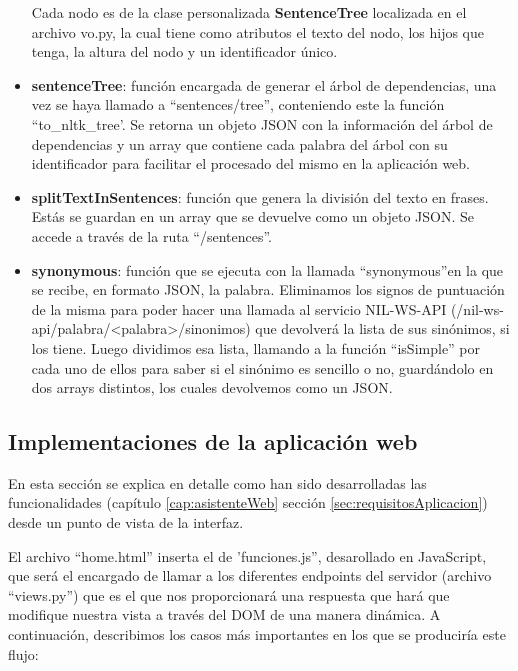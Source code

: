 \begin{itemize}
	Cada nodo es de la clase personalizada \textbf{SentenceTree} localizada en el archivo vo.py, la cual tiene como atributos el texto del nodo, los hijos que tenga, la altura del nodo y un identificador único.
	
	\item \textbf{sentenceTree}: función encargada de generar el árbol de dependencias, una vez se haya llamado a ``sentences/tree'', conteniendo este la función ``to\_nltk\_tree'. Se retorna un objeto JSON con la información del árbol de dependencias y un array que contiene cada palabra del árbol con su identificador para facilitar el procesado del mismo en la aplicación web.
	
	\item \textbf{splitTextInSentences}: función que genera la división del texto en frases. Estás se guardan en un array que se devuelve como un objeto JSON. Se accede a través de la ruta ``/sentences''.
	
	\item \textbf{synonymous}: función que se ejecuta con la llamada ``synonymous''en la que se recibe, en formato JSON, la palabra. Eliminamos los signos de puntuación de la misma para poder hacer una llamada al servicio NIL-WS-API (/nil-ws-api/palabra/<palabra>/sinonimos) que devolverá la lista de sus sinónimos, si los tiene.
	Luego dividimos esa lista, llamando a la función ``isSimple'' por cada uno de ellos para saber si el sinónimo es sencillo o no, guardándolo en dos arrays distintos, los cuales devolvemos como un JSON.
	
\end{itemize}
\subsection{Implementaciones de la aplicación web}\label{subsec:implementacionAplicacionWeb}

En esta sección se explica en detalle como han sido desarrolladas las funcionalidades (capítulo \ref{cap:asistenteWeb} sección \ref{sec:requisitosAplicacion}) desde un punto de vista de la interfaz. 

El archivo ``home.html'' inserta el de 'funciones.js'', desarollado en JavaScript, que será el encargado de llamar a los diferentes endpoints del servidor (archivo ``views.py'') que es el que nos proporcionará una respuesta que hará que modifique nuestra vista a través del DOM de una manera dinámica. A continuación, describimos los casos más importantes en los que se produciría este flujo:



